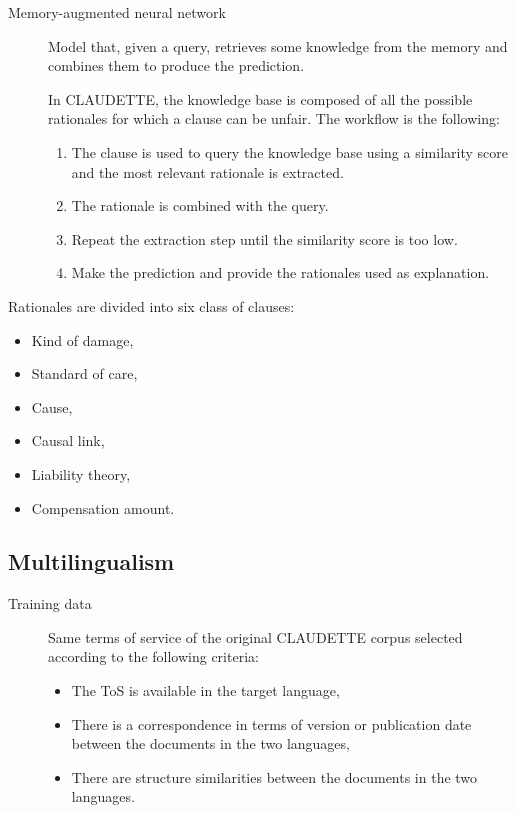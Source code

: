 \begin{description}
    \item[Memory-augmented neural network] 
        Model that, given a query, retrieves some knowledge from the memory and combines them to produce the prediction.

        In CLAUDETTE, the knowledge base is composed of all the possible rationales for which a clause can be unfair. The workflow is the following:
        \begin{enumerate}
            \item The clause is used to query the knowledge base using a similarity score and the most relevant rationale is extracted.
            \item The rationale is combined with the query.
            \item Repeat the extraction step until the similarity score is too low.
            \item Make the prediction and provide the rationales used as explanation.
        \end{enumerate}
\end{description}

\begin{example}
    Rationales are divided into six class of clauses:
    \begin{itemize}
        \item Kind of damage,
        \item Standard of care,
        \item Cause,
        \item Causal link,
        \item Liability theory,
        \item Compensation amount.
    \end{itemize}
\end{example}


\subsection{Multilingualism}

\begin{description}
    \item[Training data]
        Same terms of service of the original CLAUDETTE corpus selected according to the following criteria:
        \begin{itemize}
            \item The ToS is available in the target language,
            \item There is a correspondence in terms of version or publication date between the documents in the two languages,
            \item There are structure similarities between the documents in the two languages.
        \end{itemize}
\end{description}


